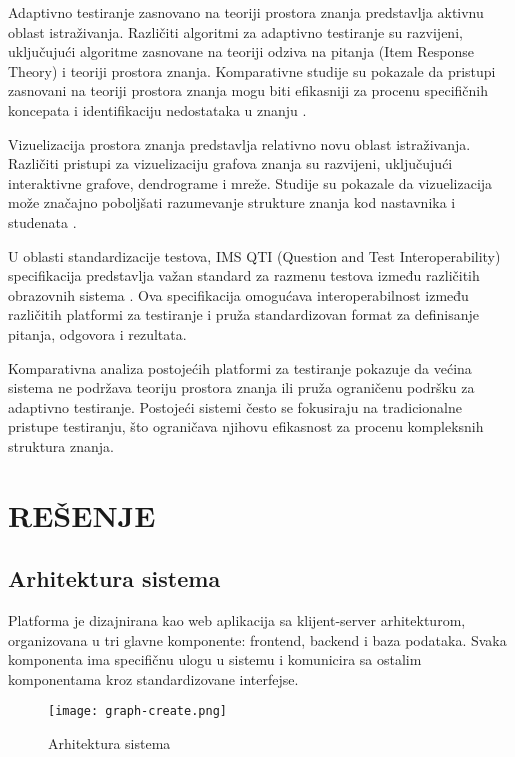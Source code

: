 \documentclass[conference]{IEEEtran}
\begin{document}
Adaptivno testiranje zasnovano na teoriji prostora znanja predstavlja aktivnu oblast istraživanja. Različiti algoritmi za adaptivno testiranje su razvijeni, uključujući algoritme zasnovane na teoriji odziva na pitanja (Item Response Theory) i teoriji prostora znanja. Komparativne studije su pokazale da pristupi zasnovani na teoriji prostora znanja mogu biti efikasniji za procenu specifičnih koncepata i identifikaciju nedostataka u znanju \cite{desmarais2012}.

Vizuelizacija prostora znanja predstavlja relativno novu oblast istraživanja. Različiti pristupi za vizuelizaciju grafova znanja su razvijeni, uključujući interaktivne grafove, dendrograme i mreže. Studije su pokazale da vizuelizacija može značajno poboljšati razumevanje strukture znanja kod nastavnika i studenata \cite{chen2014}.

U oblasti standardizacije testova, IMS QTI (Question and Test Interoperability) specifikacija predstavlja važan standard za razmenu testova između različitih obrazovnih sistema \cite{imsqti2012}. Ova specifikacija omogućava interoperabilnost između različitih platformi za testiranje i pruža standardizovan format za definisanje pitanja, odgovora i rezultata.

Komparativna analiza postojećih platformi za testiranje pokazuje da većina sistema ne podržava teoriju prostora znanja ili pruža ograničenu podršku za adaptivno testiranje. Postojeći sistemi često se fokusiraju na tradicionalne pristupe testiranju, što ograničava njihovu efikasnost za procenu kompleksnih struktura znanja.

\section{REŠENJE}

\subsection{Arhitektura sistema}

Platforma je dizajnirana kao web aplikacija sa klijent-server arhitekturom, organizovana u tri glavne komponente: frontend, backend i baza podataka. Svaka komponenta ima specifičnu ulogu u sistemu i komunicira sa ostalim komponentama kroz standardizovane interfejse.

\begin{figure}[H]
\centering
\texttt{[image: graph-create.png]}
\caption{Arhitektura sistema}
\end{figure}
\end{document}
